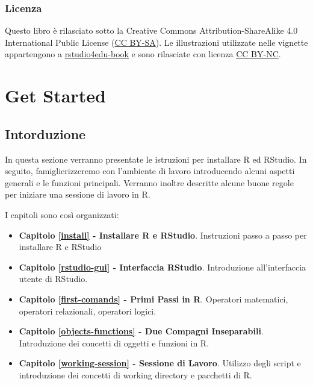\documentclass[
]{book}
\providecommand{\tightlist}{%
  \setlength{\itemsep}{0pt}\setlength{\parskip}{0pt}}
\begin{document}
\hypertarget{licenza}{%
\section*{Licenza}\label{licenza}}

Questo libro è rilasciato sotto la Creative Commons Attribution-ShareAlike 4.0 International Public License (\href{https://creativecommons.org/licenses/by-sa/4.0/legalcode}{CC BY-SA}).
Le illustrazioni utilizzate nelle vignette appartengono a \href{https://rstudio4edu.github.io/rstudio4edu-book/}{rstudio4edu-book} e sono rilasciate con licenza \href{https://creativecommons.org/licenses/by-nc/2.0/}{CC BY-NC}.

\hypertarget{part-get-started}{%
\part*{Get Started}\label{part-get-started}}

\hypertarget{intorduzione}{%
\chapter*{Intorduzione}\label{intorduzione}}

In questa sezione verranno presentate le istruzioni per installare R ed RStudio. In seguito, famiglierizzeremo con l'ambiente di lavoro introducendo alcuni aspetti generali e le funzioni principali. Verranno inoltre descritte alcune buone regole per iniziare una sessione di lavoro in R.

I capitoli sono così organizzati:

\begin{itemize}
\tightlist
\item
  \textbf{Capitolo \ref{install} - Installare R e RStudio}. Instruzioni passo a passo per installare R e RStudio
\item
  \textbf{Capitolo \ref{rstudio-gui} - Interfaccia RStudio}. Introduzione all'interfaccia utente di RStudio.
\item
  \textbf{Capitolo \ref{first-comands} - Primi Passi in R}. Operatori matematici, operatori relazionali, operatori logici.
\item
  \textbf{Capitolo \ref{objects-functions} - Due Compagni Inseparabili}. Introduzione dei concetti di oggetti e funzioni in R.
\item
  \textbf{Capitolo \ref{working-session} - Sessione di Lavoro}. Utilizzo degli script e introduzione dei concetti di working directory e pacchetti di R.
\end{itemize}
\end{document}
